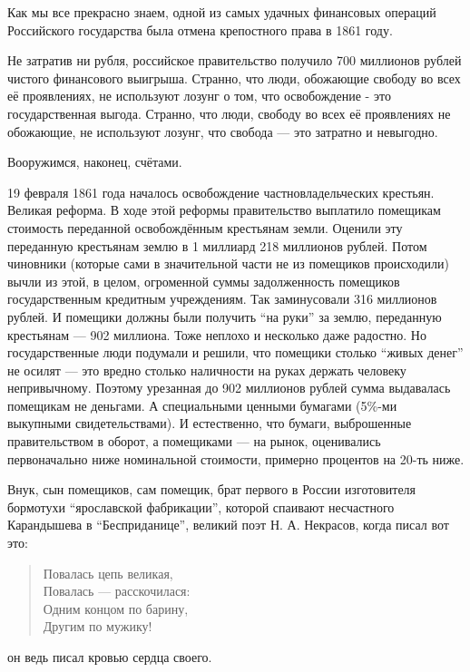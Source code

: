 Как мы все прекрасно знаем, одной из самых удачных финансовых операций
Российского государства была отмена крепостного права в 1861 году.

Не затратив ни рубля, российское правительство получило 700 миллионов рублей
чистого финансового выигрыша. Странно, что люди, обожающие свободу во всех её
проявлениях, не используют лозунг о том, что освобождение - это государственная
выгода. Странно, что люди, свободу во всех её проявлениях не обожающие, не
используют лозунг, что свобода --- это затратно и невыгодно.

\noindent Вооружимся, наконец, счётами.

19 февраля 1861 года началось освобождение частновладельческих крестьян. Великая
реформа. В ходе этой реформы правительство выплатило помещикам стоимость
переданной освобождённым крестьянам земли. Оценили эту переданную крестьянам
землю в 1 миллиард 218 миллионов рублей. Потом чиновники (которые сами в
значительной части не из помещиков происходили) вычли из этой, в целом,
огроменной суммы задолженность помещиков государственным кредитным учреждениям.
Так заминусовали 316 миллионов рублей. И помещики должны были получить
\enquote{на руки} за землю, переданную крестьянам --- 902 миллиона. Тоже неплохо
и несколько даже радостно. Но государственные люди подумали и решили, что
помещики столько \enquote{живых денег} не осилят --- это вредно столько
наличности на руках держать человеку непривычному. Поэтому урезанная до 902
миллионов рублей сумма выдавалась помещикам не деньгами. А специальными ценными
бумагами (5\%-ми выкупными свидетельствами). И естественно, что бумаги,
выброшенные правительством в оборот, а помещиками --- на рынок, оценивались
первоначально ниже номинальной стоимости, примерно процентов на 20-ть ниже.

Внук, сын помещиков, сам помещик, брат первого в России изготовителя бормотухи
\enquote{ярославской фабрикации}, которой спаивают несчастного Карандышева в
\enquote{Бесприданице}, великий  поэт Н. А. Некрасов, когда писал вот это:

\begin{verse}
Повалась цепь великая,\\
Повалась --- расскочилася:\\
Одним концом по барину,\\
Другим по мужику!\\
\end{verse}

\noindent он ведь писал кровью сердца своего.


